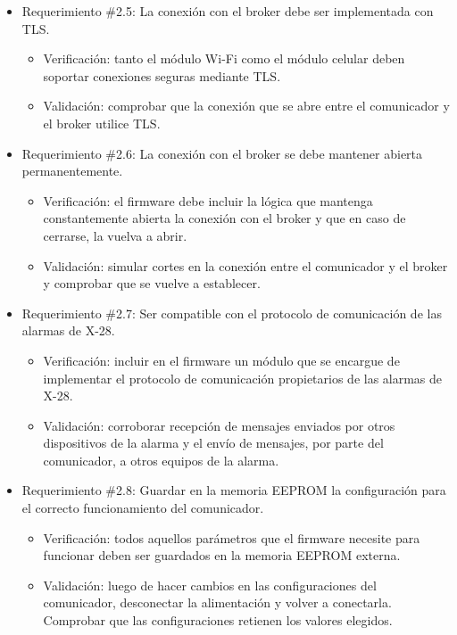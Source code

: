 \documentclass[
11pt, %
]{charter}
\begin{document}
\begin{itemize}
	\item Requerimiento \#2.5: La conexión con el broker debe ser implementada con TLS.
	\begin{itemize}
		\item Verificación: tanto el módulo Wi-Fi como el módulo celular deben soportar conexiones seguras mediante TLS.
		\item Validación: comprobar que la conexión que se abre entre el comunicador y el broker utilice TLS.
	\end{itemize}
			
	\item Requerimiento \#2.6: La conexión con el broker se debe mantener abierta permanentemente.
	\begin{itemize}
		\item Verificación: el firmware debe incluir la lógica que mantenga constantemente abierta la conexión con el broker y que en caso de cerrarse, la vuelva a abrir.
		\item Validación: simular cortes en la conexión entre el comunicador y el broker y comprobar que se vuelve a establecer.
	\end{itemize}
			
	\item Requerimiento \#2.7: Ser compatible con el protocolo de comunicación de las alarmas de X-28.
	\begin{itemize}
		\item Verificación: incluir en el firmware un módulo que se encargue de implementar el protocolo de comunicación propietarios de las alarmas de X-28.
		\item Validación: corroborar recepción de mensajes enviados por otros dispositivos de la alarma y el envío de mensajes, por parte del comunicador, a otros equipos de la alarma.
	\end{itemize}
			
	\item Requerimiento \#2.8: Guardar en la memoria EEPROM la configuración para el correcto funcionamiento del comunicador.
	\begin{itemize}
		\item Verificación: todos aquellos parámetros que el firmware necesite para funcionar deben ser guardados en la memoria EEPROM externa.
		\item Validación: luego de hacer cambios en las configuraciones del comunicador, desconectar la alimentación y volver a conectarla. Comprobar que las configuraciones retienen los valores elegidos.
	\end{itemize}
			

\end{itemize}
\end{document}
